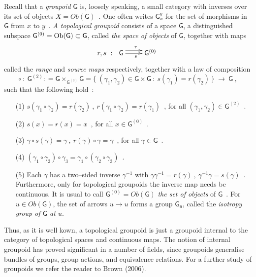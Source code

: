 \documentclass[12pt]{article}
\theoremstyle{plain}
\theoremstyle{definition}
\numberwithin{equation}{section}
\newcommand{\grp}{{\mathsf{G}}}
\newcommand{\obg}{{\rm Ob(\mathsf{G)}}}
\newcommand{\lra}{{\longrightarrow}}
\newcommand{\<}{{\langle}}
\begin{document}
 Recall that a \emph{groupoid} $\grp$ is, loosely speaking, a small
category with inverses over its set of objects $X = Ob(\grp)$~. One
often writes $\grp^y_x$ for the set of morphisms in $\grp$ from
$x$ to $y$~. \emph{A topological groupoid} consists of a space
$\grp$, a distinguished subspace $\grp^{(0)} = \obg \subset \grp$,
called {\it the space of objects} of $\grp$, together with maps
\begin{equation}
r,s~:~ \xymatrix{ \grp \ar@<1ex>[r]^r \ar[r]_s & \grp^{(0)} }
\end{equation}
called the {\it range} and {\it source maps} respectively,
together with a law of composition
\begin{equation}
\circ~:~ \grp^{(2)}: = \grp \times_{\grp^{(0)}} \grp = \{
~(\gamma_1, \gamma_2) \in \grp \times \grp ~:~ s(\gamma_1) =
r(\gamma_2)~ \}~ \lra ~\grp~,
\end{equation}
such that the following hold~:~
\begin{enumerate}
\item[(1)]
$s(\gamma_1 \circ \gamma_2) = r(\gamma_2)~,~ r(\gamma_1 \circ
\gamma_2) = r(\gamma_1)$~, for all $(\gamma_1, \gamma_2) \in
\grp^{(2)}$~.

\item[(2)]
$s(x) = r(x) = x$~, for all $x \in \grp^{(0)}$~.

\item[(3)]
$\gamma \circ s(\gamma) = \gamma~,~ r(\gamma) \circ \gamma =
\gamma$~, for all $\gamma \in \grp$~.

\item[(4)]
$(\gamma_1 \circ \gamma_2) \circ \gamma_3 = \gamma_1 \circ
(\gamma_2 \circ \gamma_3)$~.

\item[(5)]
Each $\gamma$ has a two--sided inverse $\gamma^{-1}$ with $\gamma
\gamma^{-1} = r(\gamma)~,~ \gamma^{-1} \gamma = s (\gamma)$~.
Furthermore, only for topological groupoids the inverse map needs be continuous.
It is usual to call $\grp^{(0)} = Ob(\grp)$ {\it the set of objects}
of $\grp$~. For $u \in Ob(\grp)$, the set of arrows $u \lra u$ forms a
group $\grp_u$, called the \emph{isotropy group of $\grp$ at $u$}.
\end{enumerate}

  Thus, as it is well kown, a topological groupoid is just a groupoid internal to the category of topological spaces and continuous maps. The notion of internal groupoid has proved significant in a number of fields, since groupoids generalise bundles of groups, group actions, and equivalence relations. For a further study of groupoids we refer the reader to Brown (2006).
\end{document}
